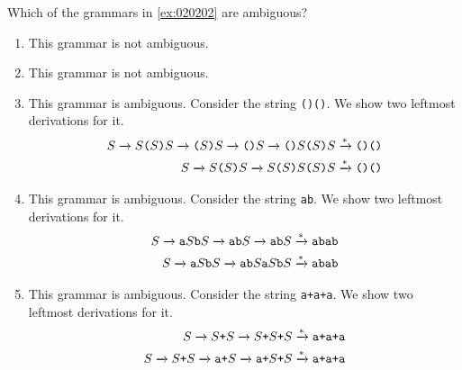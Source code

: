 \begin{exercise}\label{ex:020203}
    Which of the grammars in \cref{ex:020202} are ambiguous?
\end{exercise}
\begin{solution}\label{sol:020203}
    \begin{enumerate}
        \item This grammar is not ambiguous.
        \item This grammar is not ambiguous.
        \item This grammar is ambiguous. Consider the string \texttt{()()}.
        We show two leftmost derivations for it.
        \begin{align*}
            S \xrightarrow{} S\texttt{(}S\texttt{)}S \xrightarrow{} \texttt{(}S\texttt{)}S \xrightarrow{} \texttt{()}S \xrightarrow{} \texttt{()}S\texttt{(}S\texttt{)}S \xrightarrow{*} \texttt{()()} \\
            S \xrightarrow{} S\texttt{(}S\texttt{)}S \xrightarrow{} S\texttt{(}S\texttt{)}S\texttt{(}S\texttt{)}S \xrightarrow{*} \texttt{()()}
        \end{align*}
        \item This grammar is ambiguous. Consider the string \texttt{ab}.
        We show two leftmost derivations for it.
        \begin{align*}
            S \xrightarrow{} \texttt{a}S\texttt{b}S \xrightarrow{} \texttt{ab}S \xrightarrow{} \texttt{ab}S \xrightarrow{*} \texttt{abab} \\
            S \xrightarrow{} \texttt{a}S\texttt{b}S \xrightarrow{} \texttt{ab}S\texttt{a}S\texttt{b}S \xrightarrow{*} \texttt{abab}
        \end{align*}
        \item This grammar is ambiguous. Consider the string \texttt{a+a+a}.
        We show two leftmost derivations for it.
        \begin{align*}
            S \xrightarrow{} S\texttt{+}S \xrightarrow{} S\texttt{+}S\texttt{+}S \xrightarrow{*} \texttt{a+a+a} \\
            S \xrightarrow{} S\texttt{+}S \xrightarrow{} \texttt{a+}S \xrightarrow{} \texttt{a+}S\texttt{+}S \xrightarrow{*} \texttt{a+a+a}
        \end{align*}
    \end{enumerate}
\end{solution}